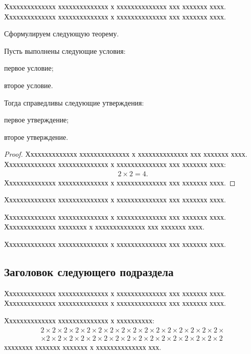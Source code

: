 \documentclass[12pt]{a&t}
\begin{document}
Хххххххххххххх хххххххххххххх х хххххххххххххх ххх ххххххх хххх.
Хххххххххххххх хххххххххххххх х хххххххххххххх ххх ххххххх хххх.

Сформулируем следующую теорему.

\begin{theorem} %
Пусть выполнены следующие условия:

\begin{ruslist}
\item
первое условие;

\item
второе условие.
\end{ruslist}

Тогда справедливы следующие утверждения:

\begin{enumlist}
\item
первое утверждение;

\item
второе утверждение.
\end{enumlist}
\end{theorem}

\begin{proof}
Хххххххххххххх хххххххххххххх х хххххххххххххх ххх ххххххх хххх.
Хххххххххххххх хххххххххххххх х хххххххххххххх ххх ххххххх хххх:
\begin{gather}
    2\times 2=4.
\end{gather}
Хххххххххххххх хххххххххххххх х хххххххххххххх ххх ххххххх хххх.
\end{proof}

Хххххххххххххх хххххххххххххх х хххххххххххххх ххх ххххххх хххх.

\begin{corollary}
Хххххххххххххх хххххххххххххх х хххххххххххххх ххх ххххххх хххх.
Хххххххххххххх хххххххх х хххххххххххххх ххх ххххххх хххх.
\end{corollary}

Хххххххххххххх хххххххххххххх х хххххххххххххх ххх ххххххх хххх.


\subsection{Заголовок следующего подраздела}

Хххххххххххххх хххххххххххххх х хххххххххххххх ххх ххххххх хххх.
Хххххххххххххх хххххххххххххх х хххххххххххххх ххх ххххххх хххх.

\begin{lemma} \label{lm:1}
Хххххххххххххх хххххххххххххх х хххххххххх:
\begin{multline}
    2\times 2\times 2\times 2\times 2\times 2\times 2\times 2\times
    2\times 2\times 2\times 2\times 2\times 2\times 2\times 2\times
\\
    \times 2\times 2\times 2\times 2\times 2\times 2\times 2\times 2\times
    2\times 2\times 2\times 2\times 2\times 2\times 2\times 2
\end{multline}
хххххххх ххххххх ххххххх х хххххххххххххх ххх.
\end{lemma}
\end{document}
